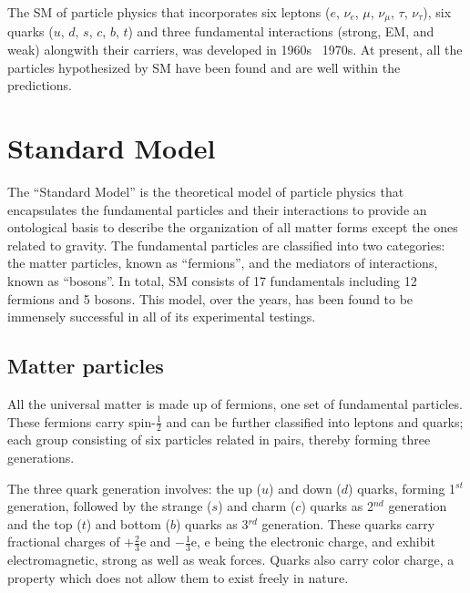 The SM of particle physics that incorporates six leptons ($e$, $\nu_{e}$, $\mu$, $\nu_{\mu}$, $\tau$, $\nu_{\tau}$),
six quarks ($u$, $d$, $s$, $c$, $b$, $t$) and three fundamental interactions (strong, EM, and weak) alongwith their carriers,
was developed in 1960s \nd\ 1970s. At present, all the particles
hypothesized by SM have been found and are well within the predictions.

\section{Standard Model}
The ``Standard Model'' is the theoretical model of particle physics that encapsulates the fundamental particles and their interactions to provide an ontological basis
to describe the organization of all matter forms except the ones related to gravity. The fundamental particles are classified into two categories:
the matter particles, known as ``fermions'', and the mediators of interactions, known as ``bosons''. In total, SM consists of 17 fundamentals including 12
fermions and 5 bosons. This model, over the years, has been found to be immensely successful in all of its experimental testings.
\subsection{Matter particles}
All the universal matter is made up of fermions, one set of fundamental particles. These fermions carry spin-$\frac{1}{2}$ and can be further
classified into leptons and quarks; each group consisting of six particles related in pairs, thereby forming three generations. 

The three quark generation involves: the up ($u$) and down ($d$) quarks, forming 1$^{st}$ generation, followed by the strange ($s$) and charm ($c$) quarks as 2$^{nd}$
generation and the top ($t$) and bottom ($b$) quarks as 3$^{rd}$ generation. These quarks carry fractional charges of $+\frac{2}{3}$e and $-\frac{1}{3}$e, e being the
electronic charge, and exhibit electromagnetic, strong as well as weak forces. Quarks also carry color charge, a property which does not allow them to exist freely
in nature. 


